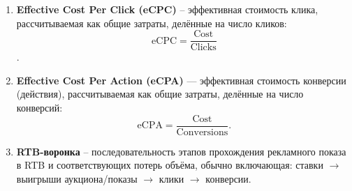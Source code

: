 \begin{enumerate}
\item \textbf{Effective Cost Per Click (eCPC)} -- эффективная стоимость клика, рассчитываемая как общие затраты, делённые на число кликов: \[\text{eCPC}=\frac{\text{Cost}}{\text{Clicks}}\].

\item \textbf{Effective Cost Per Action (eCPA)} --- эффективная стоимость конверсии (действия), рассчитываемая как общие затраты, делённые на число конверсий:\[\text{eCPA}=\frac{\text{Cost}}{\text{Conversions}}.\]

\item \textbf{RTB-воронка} -- последовательность этапов прохождения рекламного показа в RTB и соответствующих потерь объёма, обычно включающая: ставки \(\rightarrow\) выигрыши аукциона/показы \(\rightarrow\) клики \(\rightarrow\) конверсии.

\end{enumerate}

